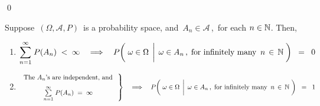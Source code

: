 \qed


\vskip 1.0cm
\begin{theorem}\label{theorem:BorelCantelli}
\mbox{}\vskip 0.1cm
\noindent
Suppose \,$(\Omega,\mathcal{A},P)$\, is a probability space, and
\,$A_{n} \in \mathcal{A}$\,,\, for each $n \in \mathbb{N}$.
Then,
\begin{enumerate}
\item
	\begin{equation*}
	\overset{\infty}{\underset{n=1}{\sum}}\;P(A_{n}) \; < \; \infty
	\quad\Longrightarrow\quad
		P\!\left(\,
			\left.
			\omega \in \overset{{\color{white}-}}{\Omega}
			\,\;\right\vert\;
			\omega \in A_{n}\,,\;\textnormal{for infinitely many \,$n\,\in\,\N$}
			\;\right)
		\;\; = \;\; 0
	\end{equation*}
\item
	\begin{equation*}
	\left.\begin{array}{c}
		\underset{{\color{white}-}}{\textnormal{The $A_{n}$'s are independent, and}}
		\\
	\overset{\infty}{\underset{n=1}{\sum}}\;P(A_{n}) \; = \; \infty
	\end{array}\;\right\}
	\quad\Longrightarrow\quad
		P\!\left(\,
			\left.
			\omega \in \overset{{\color{white}-}}{\Omega}
			\,\;\right\vert\;
			\omega \in A_{n}\,,\;\textnormal{for infinitely many \,$n\,\in\,\N$}
			\;\right)
		\;\; = \;\; 1
	\end{equation*}
\end{enumerate}
\end{theorem}
\proof
